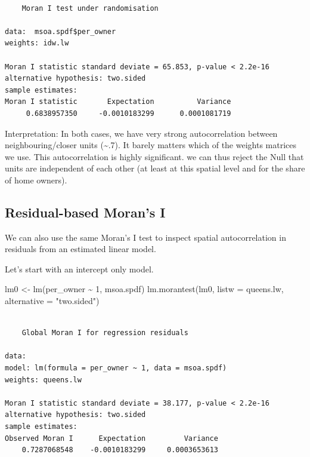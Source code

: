\documentclass[
  letterpaper,
  DIV=11,
  numbers=noendperiod]{scrreprt}
\newenvironment{Shaded}{\begin{snugshade}}{\end{snugshade}}
\newcommand{\AttributeTok}[1]{\textcolor[rgb]{0.40,0.45,0.13}{#1}}
\newcommand{\DecValTok}[1]{\textcolor[rgb]{0.68,0.00,0.00}{#1}}
\newcommand{\FunctionTok}[1]{\textcolor[rgb]{0.28,0.35,0.67}{#1}}
\newcommand{\NormalTok}[1]{\textcolor[rgb]{0.00,0.23,0.31}{#1}}
\newcommand{\OtherTok}[1]{\textcolor[rgb]{0.00,0.23,0.31}{#1}}
\newcommand{\SpecialCharTok}[1]{\textcolor[rgb]{0.37,0.37,0.37}{#1}}
\newcommand{\StringTok}[1]{\textcolor[rgb]{0.13,0.47,0.30}{#1}}
\begin{document}
\begin{verbatim}

    Moran I test under randomisation

data:  msoa.spdf$per_owner  
weights: idw.lw    

Moran I statistic standard deviate = 65.853, p-value < 2.2e-16
alternative hypothesis: two.sided
sample estimates:
Moran I statistic       Expectation          Variance 
     0.6838957350     -0.0010183299      0.0001081719 
\end{verbatim}

Interpretation: In both cases, we have very strong autocorrelation
between neighbouring/closer units (\textasciitilde.7). It barely matters
which of the weights matrices we use. This autocorrelation is highly
significant. we can thus reject the Null that units are independent of
each other (at least at this spatial level and for the share of home
owners).

\hypertarget{residual-based-morans-i}{%
\subsection{Residual-based Moran's I}\label{residual-based-morans-i}}

We can also use the same Moran's I test to inspect spatial
autocorrelation in residuals from an estimated linear model.

Let's start with an intercept only model.

\begin{Shaded}
\begin{Highlighting}[]
\NormalTok{lm0 }\OtherTok{\textless{}{-}} \FunctionTok{lm}\NormalTok{(per\_owner }\SpecialCharTok{\textasciitilde{}} \DecValTok{1}\NormalTok{, msoa.spdf)}
\FunctionTok{lm.morantest}\NormalTok{(lm0, }\AttributeTok{listw =}\NormalTok{ queens.lw, }\AttributeTok{alternative =} \StringTok{"two.sided"}\NormalTok{)}
\end{Highlighting}
\end{Shaded}

\begin{verbatim}

    Global Moran I for regression residuals

data:  
model: lm(formula = per_owner ~ 1, data = msoa.spdf)
weights: queens.lw

Moran I statistic standard deviate = 38.177, p-value < 2.2e-16
alternative hypothesis: two.sided
sample estimates:
Observed Moran I      Expectation         Variance 
    0.7287068548    -0.0010183299     0.0003653613 
\end{verbatim}
\end{document}
